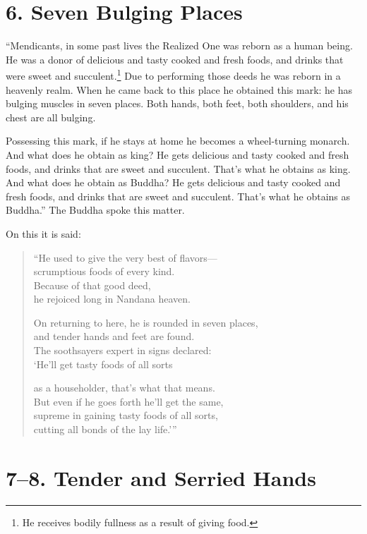\documentclass[12pt,openany]{book}%
\begin{document}
\section*{6. Seven Bulging Places }

“Mendicants, in some past lives the Realized One was reborn as a human being. He was a donor of delicious and tasty cooked and fresh foods, and drinks that were sweet and succulent.\footnote{He receives bodily fullness as a result of giving food. } Due to performing those deeds he was reborn in a heavenly realm. When he came back to this place he obtained this mark: he has bulging muscles in seven places. Both hands, both feet, both shoulders, and his chest are all bulging. 

Possessing this mark, if he stays at home he becomes a wheel-turning monarch. And what does he obtain as king? He gets delicious and tasty cooked and fresh foods, and drinks that are sweet and succulent. That’s what he obtains as king. And what does he obtain as Buddha? He gets delicious and tasty cooked and fresh foods, and drinks that are sweet and succulent. That’s what he obtains as Buddha.” The Buddha spoke this matter. 

On this it is said: 

\begin{verse}%
“He used to give the very best of flavors—\\
scrumptious foods of every kind. \\
Because of that good deed, \\
he rejoiced long in Nandana heaven. 

On returning to here, he is rounded in seven places, \\
and tender hands and feet are found. \\
The soothsayers expert in signs declared: \\
‘He’ll get tasty foods of all sorts 

as a householder, that’s what that means. \\
But even if he goes forth he’ll get the same, \\
supreme in gaining tasty foods of all sorts, \\
cutting all bonds of the lay life.’” 

%
\end{verse}

\section*{7–8. Tender and Serried Hands }
\end{document}

